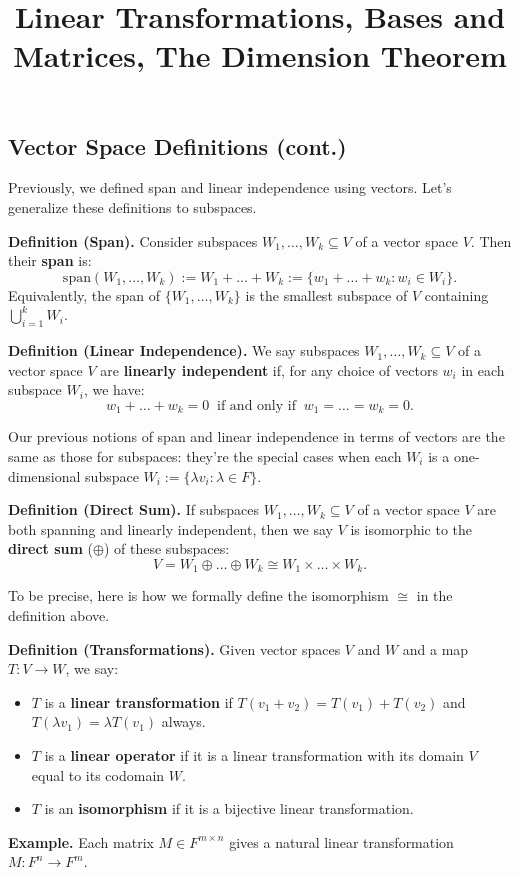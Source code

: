 \title{Linear Transformations, Bases and Matrices, The Dimension Theorem}



\subsection{Vector Space Definitions (cont.)}

Previously, we defined span and linear independence using vectors.  Let's generalize these definitions to subspaces.

\textbf{Definition (Span).} Consider subspaces $W_1, \dots, W_k \subseteq V$ of a vector space $V$.  Then their \textbf{span} is:
\[ \mathrm{span}(W_1, \dots, W_k) := W_1 + \dots + W_k := \{w_1 + \dots + w_k : w_i \in W_i\}. \]
Equivalently, the span of $\{W_1, \dots, W_k\}$ is the smallest subspace of $V$ containing $\bigcup_{i = 1}^k W_i$.

\textbf{Definition (Linear Independence).} We say subspaces $W_1, \dots, W_k \subseteq V$ of a vector space $V$ are \textbf{linearly independent} if, for any choice of vectors $w_i$ in each subspace $W_i$, we have:
\[ w_1 + \dots + w_k = 0 ~ \text{ if and only if } ~ w_1 = \dots = w_k = 0. \]
\begin{remark}
    Our previous notions of span and linear independence in terms of vectors are the same as those for subspaces: they're the special cases when each $W_i$ is a one-dimensional subspace $W_i := \{\lambda v_i: \lambda \in F\}$.
\end{remark}

\textbf{Definition (Direct Sum).} If subspaces $W_1, \dots, W_k \subseteq V$ of a vector space $V$ are both spanning and linearly independent, then we say $V$ is isomorphic to the \textbf{direct sum} ($\oplus$) of these subspaces:
\[ V = W_1 \oplus \dots \oplus W_k \cong W_1 \times \dots \times W_k. \]

To be precise, here is how we formally define the isomorphism $\cong$ in the definition above.

\textbf{Definition (Transformations).} Given vector spaces $V$ and $W$ and a map $T: V \to W$, we say:
\begin{itemize}
    \item $T$ is a \textbf{linear transformation} if $T(v_1 + v_2) = T(v_1) + T(v_2)$ and $T(\lambda v_1) = \lambda T(v_1)$ always.
    \item $T$ is a \textbf{linear operator} if it is a linear transformation with its domain $V$ equal to its codomain $W$.
    \item $T$ is an \textbf{isomorphism} if it is a bijective linear transformation.
\end{itemize}
\textbf{Example.} Each matrix $M \in F^{m \times n}$ gives a natural linear transformation $M: F^n \to F^m$.

